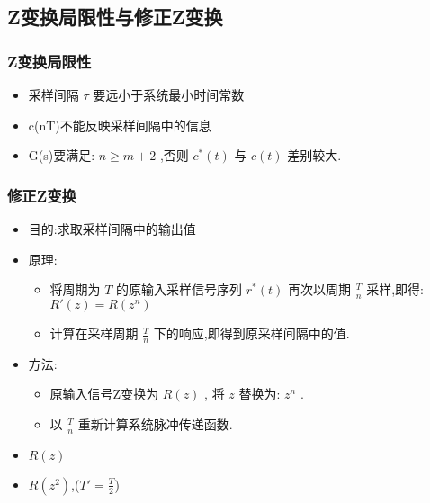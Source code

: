 \documentclass[table]{beamer}
\begin{document}
\subsection{Z变换局限性与修正Z变换}
\label{sec-4-5}
\begin{frame}
\frametitle{Z变换局限性}
\label{sec-4-5-1}

\begin{itemize}
\item <2->采样间隔 $\tau$  要远小于系统最小时间常数
\item <3->c(nT)不能反映采样间隔中的信息
\item <4->G(s)要满足:  $n\geq m+2$  ,否则  $c^*(t)$  与  $c(t)$  差别较大.
\end{itemize}
\end{frame}
\begin{frame}
\frametitle{修正Z变换}
\label{sec-4-5-2}

\begin{itemize}
\item 目的:求取采样间隔中的输出值
\item 原理:
\begin{itemize}
\item <2->将周期为  $T$  的原输入采样信号序列 $r^*(t)$ 再次以周期  $\frac{T}{n}$  采样,即得:  $R'(z)=R(z^n)$
\item <3->计算在采样周期  $\frac{T}{n}$  下的响应,即得到原采样间隔中的值.
\end{itemize}
\item 方法:
\begin{itemize}
\item <4->原输入信号Z变换为  $R(z)$ , 将 $z$  替换为:  $z^n$  .
\item <5->以  $\frac{T}{n}$ 重新计算系统脉冲传递函数.
\end{itemize}
\end{itemize}
\begin{itemize}

\item $R(z)$
\label{sec-4-5-2-1}%

\item $R(z^2)$,($T'=\frac{T}{2}$)
\label{sec-4-5-2-2}%
\end{itemize} %
\end{frame}
\end{document}
